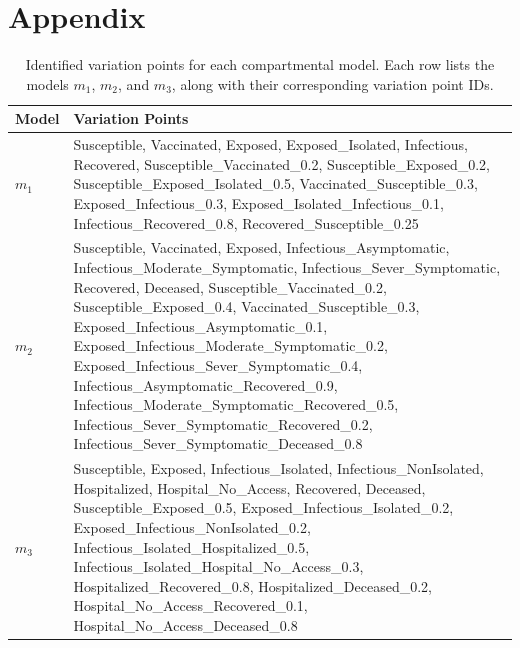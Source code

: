 \section{Appendix}
\label{section:appendix}


\begin{table}[ht]
\centering
\begin{tabularx}{\textwidth}{|l|Y|}
\hline
\textbf{Model} & \textbf{Variation Points} \\ \hline
$m_1$ & Susceptible, Vaccinated, Exposed, Exposed\_Isolated, Infectious, Recovered, Susceptible\_Vaccinated\_0.2, Susceptible\_Exposed\_0.2, Susceptible\_Exposed\_Isolated\_0.5, Vaccinated\_Susceptible\_0.3, Exposed\_Infectious\_0.3, Exposed\_Isolated\_Infectious\_0.1, Infectious\_Recovered\_0.8, Recovered\_Susceptible\_0.25 \\ \hline
$m_2$ & Susceptible, Vaccinated, Exposed, Infectious\_Asymptomatic, Infectious\_Moderate\_Symptomatic, Infectious\_Sever\_Symptomatic, Recovered, Deceased, Susceptible\_Vaccinated\_0.2, Susceptible\_Exposed\_0.4, Vaccinated\_Susceptible\_0.3, Exposed\_Infectious\_Asymptomatic\_0.1, Exposed\_Infectious\_Moderate\_Symptomatic\_0.2, Exposed\_Infectious\_Sever\_Symptomatic\_0.4, Infectious\_Asymptomatic\_Recovered\_0.9, Infectious\_Moderate\_Symptomatic\_Recovered\_0.5, Infectious\_Sever\_Symptomatic\_Recovered\_0.2, Infectious\_Sever\_Symptomatic\_Deceased\_0.8\\ \hline
$m_3$ & Susceptible, Exposed, Infectious\_Isolated, Infectious\_NonIsolated, Hospitalized, Hospital\_No\_Access, Recovered, Deceased, Susceptible\_Exposed\_0.5, Exposed\_Infectious\_Isolated\_0.2, Exposed\_Infectious\_NonIsolated\_0.2, Infectious\_Isolated\_Hospitalized\_0.5, Infectious\_Isolated\_Hospital\_No\_Access\_0.3, Hospitalized\_Recovered\_0.8, Hospitalized\_Deceased\_0.2, Hospital\_No\_Access\_Recovered\_0.1, Hospital\_No\_Access\_Deceased\_0.8 \\ \hline

\end{tabularx}
\caption{Identified variation points for each compartmental model. Each row lists the models $m_1$, $m_2$, and $m_3$, along with their corresponding variation point IDs.}
\label{tab:prototype_variation_points}
\end{table}


